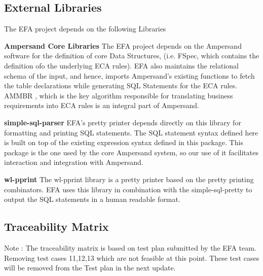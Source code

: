 \documentclass[12pt, svgnames]{article}
\let\Oldsubsection\subsection
\renewcommand{\subsection}{\FloatBarrier\Oldsubsection}
\begin{document}
        
\subsection{External Libraries}
The EFA project depends on the following Libraries 
\begin{description}
	\item \textbf{Ampersand Core Libraries} \newline
		The EFA project depends on the Ampersand software for the definition of 
		core Data Structures, (i.e. FSpec, which contains the definition ofo 
		the underlying ECA rules). EFA also maintains the relational schema of 
		the input, and hence, imports Ampersand's existing functions to fetch 
		the table declarations while generating SQL Statements for the ECA 
		rules. AMMBR \cite{AMMBR}, which is the key algorithm responsible for 
		translating business requirements into ECA rules is an integral part of 
		Ampersand.
	\item \textbf{simple-sql-parser} \newline
		EFA's pretty printer depends directly on this library for formatting 
		and printing SQL statements. The SQL statement syntax 
                defined here is built on top of the existing expression syntax defined 
                in this package. This package is the one used by the core Ampersand system,
                so our use of it facilitates interaction and integration with Ampersand. \cite{simple-sql}
	\item \textbf{wl-pprint} \newline 
          The wl-pprint library\cite{wl-pprint} is a pretty printer based on the
          pretty printing combinators. EFA uses this library in combination with
          the simple-sql-pretty to output the SQL statements in a human readable
          format.
	\item 
\end{description}

\subsection{Traceability Matrix} \label{SecTM}

Note : The traceability matrix is based on test plan submitted by the EFA team. Removing test cases 11,12,13 which are not feasible at this point. These test cases will be removed from the Test plan in the next update.
\end{document}
